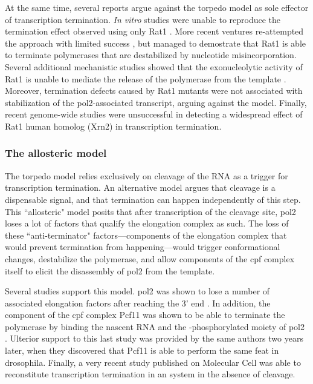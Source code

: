 At the same time, several reports argue against the torpedo model as sole effector of transcription termination.
\emph{In vitro} studies were unable to reproduce the termination effect observed \invivo{} using only Rat1 \citep{dengl:2009:torpedo}. More recent ventures re-attempted the \invitro{} approach with limited success \citep{park:2015:unraveling}, but managed to demostrate that Rat1 is able to terminate polymerases that are destabilized by nucleotide misincorporation.
Several additional mechanistic studies showed that the exonucleolytic activity of Rat1 is unable to mediate the release of the polymerase from the template \citep{luo:2006:role, pearson:2013:dismantling}.
Moreover, termination defects caused by Rat1 mutants were not associated with stabilization of the \gls{pol2}-associated transcript, arguing against the model.
Finally, recent genome-wide studies were unsuccessful in detecting a widespread effect of Rat1 human homolog (Xrn2) in transcription termination\citep{nojima:2015:mammalian}.


\subsubsection{The allosteric model}

The torpedo model relies exclusively on cleavage of the RNA as a trigger for transcription termination.
An alternative model argues that cleavage is a dispensable signal, and that termination can happen independently of this step.
This ``allosteric" model posits that after transcription of the cleavage site, \gls{pol2} loses a lot of factors that qualify the elongation complex as such.
The loss of these ``anti-terminator" factors---components of the elongation complex that would prevent termination from happening---would trigger conformational changes, destabilize the polymerase, and allow components of the \gls{cpf} complex itself to elicit the disassembly of \gls{pol2} from the template.

Several studies support this model. 
\gls{pol2} was shown to lose a number of associated elongation factors after reaching the 3' end \citep{kim:2004:transitions}.
In addition, the component of the \gls{cpf} complex Pcf11 was shown to be able to terminate the polymerase \invitro{} by binding the nascent RNA and the \sert{}-phosphorylated moiety of \gls{pol2} \citep{zhang:2005:ctddependent}.
Ulterior support to this last study was provided by the same authors two years later, when they discovered that Pcf11 is able to perform the same feat in drosophila\citep{zhang:2006:pcf11}.
Finally, a very recent study published on Molecular Cell was able to reconstitute transcription termination in an \invitro{} system in the absence of cleavage\citep{zhang:2015:polya}.

